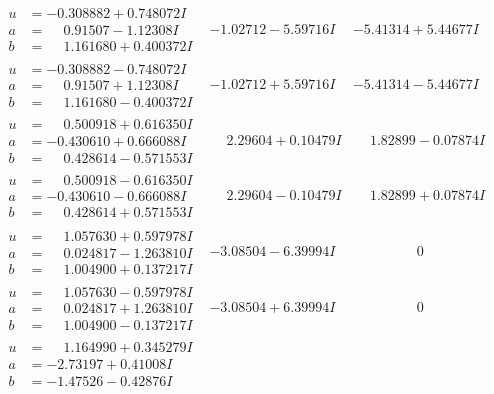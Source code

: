 \documentclass[1p]{elsarticle_modified}
\theoremstyle{definition}
\begin{document}
$$\begin{array}{c|c|c}
\begin{aligned}
u &= -0.308882 + 0.748072 I \\
a &= \phantom{-}0.91507 - 1.12308 I \\
b &= \phantom{-}1.161680 + 0.400372 I\end{aligned}
 & -1.02712 - 5.59716 I & -5.41314 + 5.44677 I \\ \hline\begin{aligned}
u &= -0.308882 - 0.748072 I \\
a &= \phantom{-}0.91507 + 1.12308 I \\
b &= \phantom{-}1.161680 - 0.400372 I\end{aligned}
 & -1.02712 + 5.59716 I & -5.41314 - 5.44677 I \\ \hline\begin{aligned}
u &= \phantom{-}0.500918 + 0.616350 I \\
a &= -0.430610 + 0.666088 I \\
b &= \phantom{-}0.428614 - 0.571553 I\end{aligned}
 & \phantom{-}2.29604 + 0.10479 I & \phantom{-}1.82899 - 0.07874 I \\ \hline\begin{aligned}
u &= \phantom{-}0.500918 - 0.616350 I \\
a &= -0.430610 - 0.666088 I \\
b &= \phantom{-}0.428614 + 0.571553 I\end{aligned}
 & \phantom{-}2.29604 - 0.10479 I & \phantom{-}1.82899 + 0.07874 I \\ \hline\begin{aligned}
u &= \phantom{-}1.057630 + 0.597978 I \\
a &= \phantom{-}0.024817 - 1.263810 I \\
b &= \phantom{-}1.004900 + 0.137217 I\end{aligned}
 & -3.08504 - 6.39994 I & \phantom{-0.000000 } 0 \\ \hline\begin{aligned}
u &= \phantom{-}1.057630 - 0.597978 I \\
a &= \phantom{-}0.024817 + 1.263810 I \\
b &= \phantom{-}1.004900 - 0.137217 I\end{aligned}
 & -3.08504 + 6.39994 I & \phantom{-0.000000 } 0 \\ \hline\begin{aligned}
u &= \phantom{-}1.164990 + 0.345279 I \\
a &= -2.73197 + 0.41008 I \\
b &= -1.47526 - 0.42876 I\end{aligned}

\end{array}$$
\end{document}
